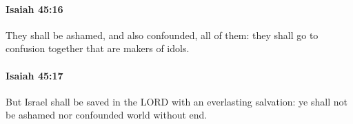 		\paragraph{Isaiah 45:16} %
			\label{ISAIAH-45-16}

			They shall be ashamed, and also confounded, all of them: they shall go to confusion together that are makers of idols.


		\paragraph{Isaiah 45:17} %
			\label{ISAIAH-45-17}

			But Israel shall be saved in the LORD with an everlasting salvation: ye shall not be ashamed nor confounded world without end.


